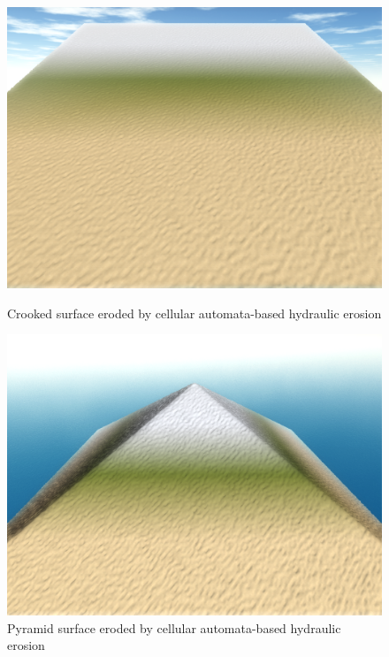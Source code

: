 \documentclass[11pt,a4paper,twoside,openright]{report}
\begin{document}
\begin{figure}[!htb]
  \includegraphics[width=\linewidth]{hydro-10mins-46k-iterations-crooked.png}
  \caption{Crooked surface eroded by cellular automata-based hydraulic erosion}\label{fig:hydro1}
\endminipage\hfill
{}
  \includegraphics[width=\linewidth]{hydro-10mins-46k-iterations-pyramid.png}
  \caption{Pyramid surface eroded by cellular automata-based hydraulic erosion}\label{fig:hydro2}
\endminipage\hfill
{}%

\end{figure}
\end{document}
